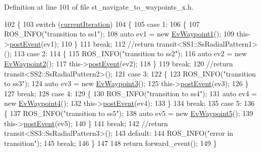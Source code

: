 Definition at line 101 of file st\+\_\+navigate\+\_\+to\+\_\+waypoints\+\_\+x.\+h.


\begin{DoxyCode}
102   \{
103     \textcolor{keywordflow}{switch} (\hyperlink{structStNavigateToWaypointsX_a2f597fd0ee0258ef66506e98d55e8060}{currentIteration})
104     \{
105     \textcolor{keywordflow}{case} 1:
106     \{
107       ROS\_INFO(\textcolor{stringliteral}{"transition to ss1"});
108       \textcolor{keyword}{auto} ev1 = \textcolor{keyword}{new} \hyperlink{structEvWaypoint1}{EvWaypoint1}();
109       this->\hyperlink{classsmacc_1_1SmaccState_ae0e035e2d4e60f4ad58f08f44261f26c}{postEvent}(ev1);
110     \}
111     \textcolor{keywordflow}{break};
112       \textcolor{comment}{//return transit<SS1::SsRadialPattern1>();}
113     \textcolor{keywordflow}{case} 2:
114     \{
115       ROS\_INFO(\textcolor{stringliteral}{"transition to ss2"});
116       \textcolor{keyword}{auto} ev2 = \textcolor{keyword}{new} \hyperlink{structEvWaypoint2}{EvWaypoint2}();
117       this->\hyperlink{classsmacc_1_1SmaccState_ae0e035e2d4e60f4ad58f08f44261f26c}{postEvent}(ev2);
118     \}
119     \textcolor{keywordflow}{break};
120       \textcolor{comment}{//return transit<SS2::SsRadialPattern2>();}
121     \textcolor{keywordflow}{case} 3:
122     \{
123       ROS\_INFO(\textcolor{stringliteral}{"transition to ss3"});
124       \textcolor{keyword}{auto} ev3 = \textcolor{keyword}{new} \hyperlink{structEvWaypoint3}{EvWaypoint3}();
125       this->\hyperlink{classsmacc_1_1SmaccState_ae0e035e2d4e60f4ad58f08f44261f26c}{postEvent}(ev3);
126     \}
127     \textcolor{keywordflow}{break};
128     \textcolor{keywordflow}{case} 4:
129     \{
130       ROS\_INFO(\textcolor{stringliteral}{"transition to ss4"});
131       \textcolor{keyword}{auto} ev4 = \textcolor{keyword}{new} \hyperlink{structEvWaypoint4}{EvWaypoint4}();
132       this->\hyperlink{classsmacc_1_1SmaccState_ae0e035e2d4e60f4ad58f08f44261f26c}{postEvent}(ev4);
133     \}
134     \textcolor{keywordflow}{break};
135     \textcolor{keywordflow}{case} 5:
136     \{
137       ROS\_INFO(\textcolor{stringliteral}{"transition to ss5"});
138       \textcolor{keyword}{auto} ev5 = \textcolor{keyword}{new} \hyperlink{structEvWaypoint5}{EvWaypoint5}();
139       this->\hyperlink{classsmacc_1_1SmaccState_ae0e035e2d4e60f4ad58f08f44261f26c}{postEvent}(ev5);
140     \}
141     \textcolor{keywordflow}{break};
142       \textcolor{comment}{//return transit<SS3::SsRadialPattern3>();}
143     \textcolor{keywordflow}{default}:
144       ROS\_INFO(\textcolor{stringliteral}{"error in transition"});
145       \textcolor{keywordflow}{break};
146     \}
147 
148     \textcolor{keywordflow}{return} forward\_event();
149   \}
\end{DoxyCode}
